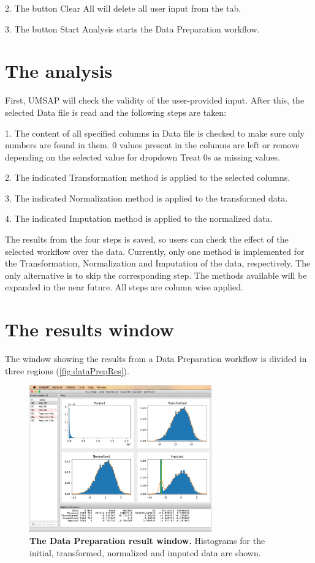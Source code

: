 \num{2}. The button Clear All will delete all user input from the tab.

\num{3}. The button Start Analysis starts the Data Preparation workflow.

\section{The analysis}

First, UMSAP will check the validity of the user-provided input. After this, the
selected Data file is read and the following steps are taken:

\num{1}. The content of all specified columns in Data file is checked to make sure
only numbers are found in them. \num{0} values present in the columns are left or
remove depending on the selected value for dropdown Treat \num{0}s as missing values.

\num{2}. The indicated Transformation method is applied to the selected columns.

\num{3}. The indicated Normalization method is applied to the transformed data.

\num{4}. The indicated Imputation method is applied to the normalized data.

The results from the four steps is saved, so users can check the effect of the selected
workflow over the data. Currently, only one method is implemented for the Transformation,
Normalization and Imputation of the data, respectively. The only alternative is to skip
the corresponding step. The methods available will be expanded in the near future.
All steps are column wise applied.

\section{The results window}

The window showing the results from a Data Preparation workflow is divided in three
regions (\autoref{fig:dataPrepRes}).

\begin{figure}[h]
    \centering
    \includegraphics[width=0.7\textwidth]{./IMAGES/DATAPREP/DataPrepRes.jpg}
    \caption[The Data Preparation result window]{\textbf{The Data Preparation
    result window.} Histograms for the initial, transformed, normalized and
    imputed data are shown. }
    \label{fig:dataPrepRes}
    \vspace{-5pt} 	
\end{figure} 

